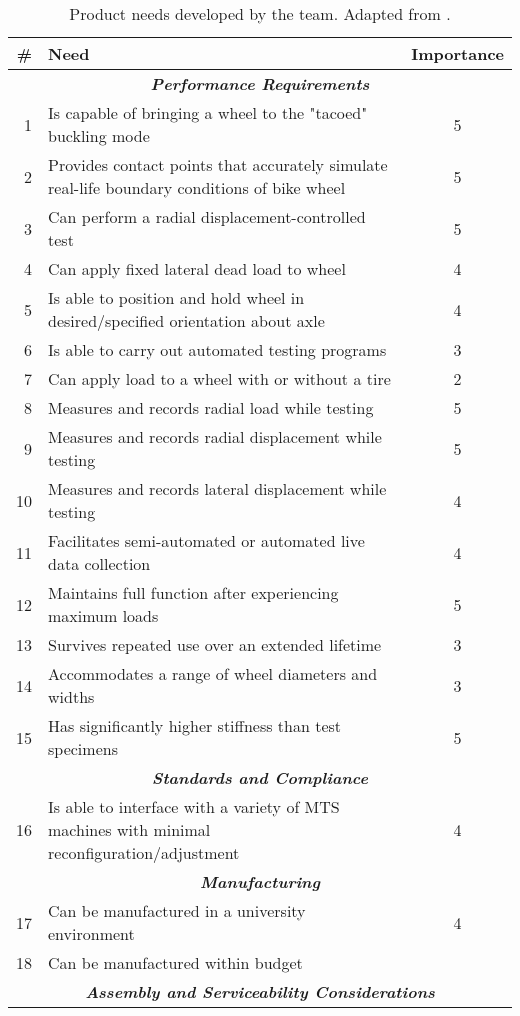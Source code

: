 \documentclass[\rootdir/thesis.tex]{subfiles}
\begin{document}
\begin{table}
\caption{Product needs developed by the team. Adapted from \cite{WheelCats2018}.}
\label{tab:wheelcats_needs}
\begin{tabularx}{\linewidth}{r|Xc}
\hline
\bf{\#}& \bf{Need}& \bf{Importance}\\
\hline
\multicolumn{3}{c}{\emph{\textbf{Performance Requirements}}}\\
\hline
1 & Is capable of bringing a wheel to the "tacoed" buckling mode& 5\\
2 & Provides contact points that accurately simulate real-life boundary conditions of bike wheel& 5\\
3 & Can perform a radial displacement-controlled test& 5\\
4 & Can apply fixed lateral dead load to wheel& 4\\
5 & Is able to position and hold wheel in desired/specified orientation about axle& 4\\
6 & Is able to carry out automated testing programs& 3\\
7 & Can apply load to a wheel with or without a tire& 2\\
8 & Measures and records radial load while testing& 5\\
9 & Measures and records radial displacement while testing& 5\\
10& Measures and records lateral displacement while testing& 4\\
11& Facilitates semi-automated or automated live data collection& 4\\
12& Maintains full function after experiencing maximum loads& 5\\
13& Survives repeated use over an extended lifetime& 3\\
14& Accommodates a range of wheel diameters and widths& 3\\
15& Has significantly higher stiffness than test specimens& 5\\
\hline
\multicolumn{3}{c}{\emph{\textbf{Standards and Compliance}}}\\
\hline
16& Is able to interface with a variety of MTS machines with minimal reconfiguration/adjustment& 4\\
\hline
\multicolumn{3}{c}{\emph{\textbf{Manufacturing}}}\\
\hline
17& Can be manufactured in a university environment& 4\\
18& Can be manufactured within budget\\
\hline
\multicolumn{3}{c}{\emph{\textbf{Assembly and Serviceability Considerations}}}\\

\end{tabularx}
\end{table}
\end{document}
